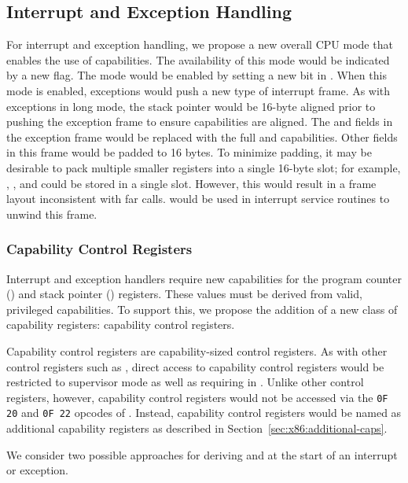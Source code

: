 \subsection{Interrupt and Exception Handling}
\label{sec:x86:interrupt-exception}

For interrupt and exception handling, we propose a new overall CPU
mode that enables the use of capabilities.  The availability of this
mode would be indicated by a new  flag.  The mode
would be enabled by setting a new bit in \CRFOUR{}.  When this mode is
enabled, exceptions would push a new type of interrupt frame.  As with
exceptions in long mode, the stack pointer would be 16-byte aligned
prior to pushing the exception frame to ensure capabilities are
aligned.  The \RIP{} and \RSP{} fields in the exception frame would be
replaced with the full \CIP{} and \CSP{} capabilities.  Other fields
in this frame would be padded to 16 bytes.  To minimize padding, it
may be desirable to pack multiple smaller registers into a single
16-byte slot; for example, \SS{}, \CS{}, and \RFLAGS{} could be stored
in a single slot.  However, this would result in a frame layout
inconsistent with far calls.   would be used in
interrupt service routines to unwind this frame.

\subsubsection{Capability Control Registers}
\label{sec:x86:capability-control-registers}

Interrupt and exception handlers require new capabilities for the
program counter (\CIP{}) and stack pointer (\CSP{}) registers.  These
values must be derived from valid, privileged capabilities.  To
support this, we propose the addition of a new class of capability
registers: capability control registers.

Capability control registers are capability-sized control registers.
As with other control registers such as \CRFOUR, direct access to
capability control registers would be restricted to supervisor mode as
well as requiring \cappermASR{} in \CIP{}.  Unlike other control
registers, however, capability control registers would not be accessed
via the \texttt{0F 20} and \texttt{0F 22} opcodes of .
Instead, capability control registers would be named as additional
capability registers as described in
Section~\ref{sec:x86:additional-caps}.

We consider two possible approaches for deriving \CIP{} and \CSP{} at
the start of an interrupt or exception.

